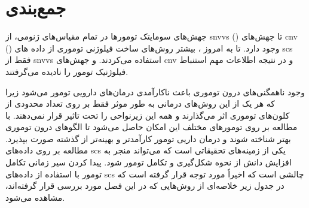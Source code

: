 \section{جمع‌بندی}

جهش‌های سومایتک تومورها در تمام مقیاس‌های ژنومی، از  \glspl{snvv} () تا جهش‌های \gls{cnv} () وجود دارد. تا به امروز ، بیشتر روش‌های ساخت فیلوژنی توموری از داده های \gls{scs}  فقط از  \glspl{snvv} استفاده می‌کردند.  \cite{singer2018single, malikic2015clonality, mcpherson2016divergent, el2018sphyr}  و جهش‌های \gls{cnv} و در نتیجه اطلاعات مهم استنباط فیلوژنیک تومور را نادیده می‌گرفتند. 


وجود ناهمگنی‌های درون توموری باعث ناکارآمدی درمان‌های دارویی تومور می‌شود زیرا که هر یک از این روش‌های درمانی به طور موثر فقط بر روی تعداد محدودی از کلون‌های توموری اثر می‌گذارند و همه این زیرنواحی را تحت تاثیر قرار نمی‌دهند. با مطالعه بر روی تومورهای مختلف این امکان حاصل می‌شود تا الگوهای درون توموری بهتر شناخته شوند و درمان داریی تومور کارآمدتر و بهینه‌تر از گذشته صورت بپذیرد. مطالعه بر روی داده‌های \gls{scs} یکی از زمینه‌های تحقیقاتی است که می‌تواند منجر به افزایش دانش از نحوه شکل‌گیری و تکامل تومور شود. پیدا کردن سیر زمانی تکامل تومور با استفاده از داده‌های \gls{scs} چالشی است که اخیراً مورد توجه قرار گرفته است که در جدول زیر خلاصه‌ای از روش‌هایی که در این فصل مورد بررسی قرار گرفته‌اند، مشاهده می‌شود. 

